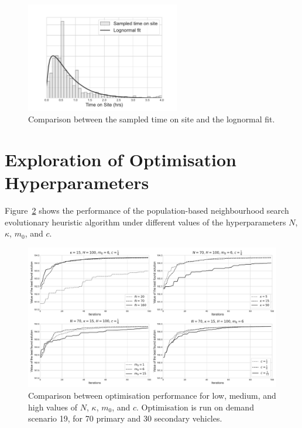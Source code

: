 \documentclass[preprint,12pt]{elsarticle}
\begin{document}
\begin{figure}[ht]
\centering
  \includegraphics[width=0.6\textwidth]{img/time_on_site_fit.pdf}
    \caption{Comparison between the sampled time on site and the lognormal
             fit.}
  \label{fig:lognorm_fit}
\end{figure}


\section{Exploration of Optimisation Hyperparameters}\label{apx:hyperparameters}
Figure~\ref{fig:hyperparameters_exploration} shows the performance of the
population-based neighbourhood search evolutionary heuristic algorithm under
different values of the hyperparameters $N$, $\kappa$, $m_0$, and $c$.

\begin{figure}[ht]
\centering
\includegraphics[width=\textwidth]{img/hyperparameter_exploration}
\caption{Comparison between optimisation performance for low, medium, and high
values of $N$, $\kappa$, $m_0$, and $c$. Optimisation is run on demand
scenario 19, for 70 primary and 30 secondary vehicles.}
\label{fig:hyperparameters_exploration}
\end{figure}
\end{document}
